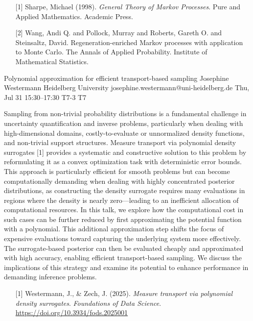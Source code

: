 \begin{talk}
\medskip

\begin{enumerate}
	\item[{[1]}] Sharpe, Michael (1998). {\it General Theory of Markov Processes}. Pure and Applied Mathematics. Academic Press.
	\item[{[2]}] Wang, Andi Q. and Pollock, Murray and Roberts, Gareth O. and Steinsaltz, David. Regeneration-enriched Markov processes with application to Monte Carlo. The Annals of Applied Probability. Institute of Mathematical Statistics.
\end{enumerate}

\end{talk}

\begin{talk}
  {Polynomial approximation for efficient transport-based sampling}%
  {Josephine Westermann}%
  {Heidelberg University}%
  {josephine.westermann@uni-heidelberg.de}%
  {}%
  {}%
  {Thu, Jul 31 15:30–17:30}%
  {T7-3}%
  {T7}%
  {}%
  {}

Sampling from non-trivial probability distributions is a fundamental challenge in uncertainty quantification and inverse problems, particularly when dealing with high-dimensional domains, costly-to-evaluate or unnormalized density functions, and non-trivial support structures. Measure transport via polynomial density surrogates [1] provides a systematic and constructive solution to this problem by reformulating it as a convex optimization task with deterministic error bounds. This approach is particularly efficient for smooth problems but can become computationally demanding when dealing with highly concentrated posterior distributions, as constructing the density surrogate requires many evaluations in regions where the density is nearly zero—leading to an inefficient allocation of computational resources. In this talk, we explore how the computational cost in such cases can be further reduced by first approximating the potential function with a polynomial. This additional approximation step shifts the focus of expensive evaluations toward capturing the underlying system more effectively. The surrogate-based posterior can then be evaluated cheaply and approximated with high accuracy, enabling efficient transport-based sampling. We discuss the implications of this strategy and examine its potential to enhance performance in demanding inference problems.

\medskip

\begin{enumerate}
	\item[{[1]}] Westermann, J., \& Zech, J. (2025). \textit{Measure transport via polynomial density surrogates}. \textit{Foundations of Data Science}. \url{https://doi.org/10.3934/fods.2025001}
\end{enumerate}

\end{talk}

